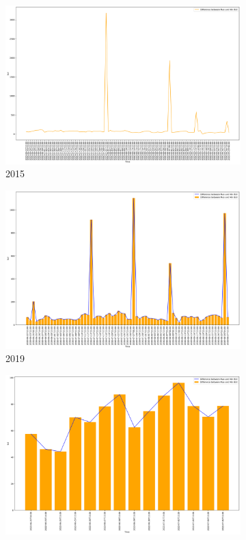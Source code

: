 \begin{figure}[h]
	\centering
	\caption{Daily difference of max and min BUI values}
	\begin{subfigure}{0.45\textwidth}
		\centering
		\includegraphics[width=\textwidth]{graphs/2015/byHour/BUI_DIFFmaxMin.png}
		\caption{2015}
	\end{subfigure}
	\hfill
	\begin{subfigure}{0.45\textwidth}
		\centering
		\includegraphics[width=\textwidth]{graphs/2019/byHour/BUI_DIFFmaxMin.png}
		\caption{2019}
	\end{subfigure}
	\hfill
	\begin{subfigure}{0.45\textwidth}
		\centering
		\includegraphics[width=\textwidth]{graphs/2022/BUI_DIFFmaxMin.png}

\end{subfigure}
\end{figure}

